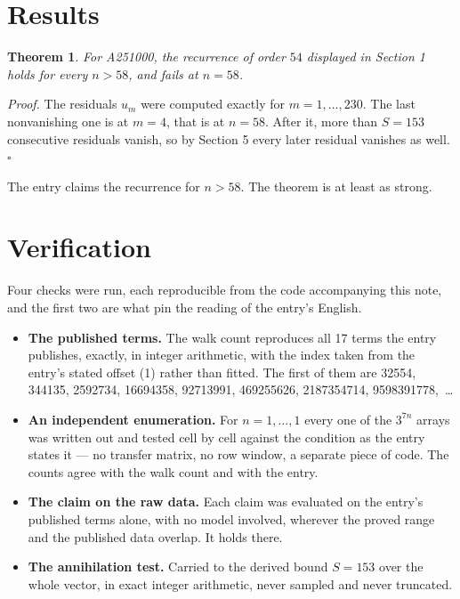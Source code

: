 \documentclass[11pt]{article}
\newtheorem{theorem}{Theorem}
\theoremstyle{definition}
\begin{document}
\section{Results}

\begin{theorem} For A251000, the recurrence of order $54$ displayed in Section 1 holds for every $n > 58$, and fails at $n = 58$.\end{theorem}

{\itshape Proof.} The residuals $u_m$ were computed exactly for $m = 1,\dots,230$. The last nonvanishing one is at $m = 4$, that is at $n = 58$. After it, more than $S = 153$ consecutive residuals vanish, so by Section 5 every later residual vanishes as well. $\square$

The entry claims the recurrence for $n > 58$. The theorem is at least as strong.

\section{Verification}

Four checks were run, each reproducible from the code accompanying this note, and the first two are what pin the reading of the entry's English.

\begin{itemize}

\item {\bfseries The published terms.} The walk count reproduces all 17 terms the entry publishes, exactly, in integer arithmetic, with the index taken from the entry's stated offset (1) rather than fitted. The first of them are 32554, 344135, 2592734, 16694358, 92713991, 469255626, 2187354714, 9598391778,~\dots

\item {\bfseries An independent enumeration.} For $n = 1,\dots,1$ every one of the $3^{7n}$ arrays was written out and tested cell by cell against the condition as the entry states it --- no transfer matrix, no row window, a separate piece of code. The counts agree with the walk count and with the entry.

\item {\bfseries The claim on the raw data.} Each claim was evaluated on the entry's published terms alone, with no model involved, wherever the proved range and the published data overlap. It holds there.

\item {\bfseries The annihilation test.} Carried to the derived bound $S = 153$ over the whole vector, in exact integer arithmetic, never sampled and never truncated.

\end{itemize}
\end{document}
